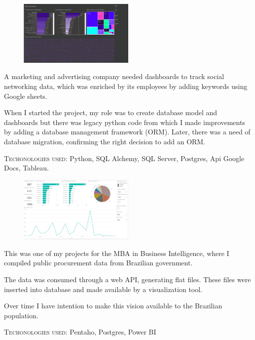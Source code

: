     \cvparagraph
    {
      \begin{figure}
        \centering
        \vspace{-10pt}
        \includegraphics[width=0.5\textwidth]{img/project1}
      \end{figure}
      A marketing and advertising company needed dashboards to track social networking data, which was enriched by its employees by adding keywords using Google sheets.

      When I started the project, my role was to create database model and dashboards but there was legacy python code from which I made improvements by adding a database management framework (ORM). Later, there was a need of database migration, confirming the right decision to add an ORM.

      \textsc{Techonologies used}: Python, SQL Alchemy, SQL Server, Postgres, Api Google Docs, Tableau.
      \vfill
    }



     \cvparagraph
     {
      \begin{figure}
        \centering
        \vspace{-10pt}
        \includegraphics[width=0.5\textwidth]{img/project3}
      \end{figure}
      This was one of my projects for the MBA in Business Intelligence, where I compiled public procurement data from Brazilian government.

      The data was consumed through a web API, generating flat files. These files were inserted into database and made available by a visualization tool.

      Over time I have intention to make this vision available to the Brazilian population.

      \textsc{Techonologies used}: Pentaho, Postgres, Power BI
      \vfill
    }
